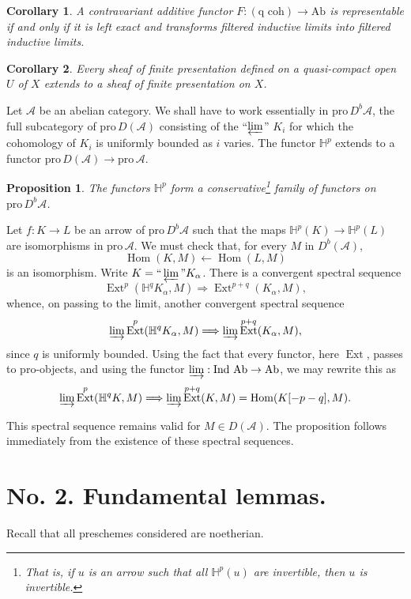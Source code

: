\documentclass[12pt]{amsart}
\theoremstyle{plain}
\newtheorem{prop}{Proposition}
\newtheorem{cor}{Corollary}
\theoremstyle{definition}
\DeclareMathOperator{\Hom}{Hom}
\DeclareMathOperator{\Ext}{Ext}
\newcommand{\Ind}{\text{Ind}\,}
\newcommand{\Pro}{\text{pro}\,}
\newcommand{\Ab}{\text{Ab}}
\newcommand{\cA}{\mathcal{A}}
\newcommand{\cDb}{D^{b}}
\newcommand{\cD}{D}
\newcommand{\bH}{\mathbb{H}}
\begin{document}
\begin{cor}
A contravariant additive functor $F:(\text{q coh})\to\Ab$ is representable if and only if it is left exact and transforms filtered inductive limits into filtered inductive limits.
\end{cor}

\begin{cor}
Every sheaf of finite presentation defined on a quasi-compact open $U$ of $X$ extends to a sheaf of finite presentation on $X$.
\end{cor}

\medskip

Let $\cA$ be an abelian category. We shall have to work essentially in $\Pro\cDb\cA$, the full subcategory of $\Pro\cD(\cA)$ consisting of the ``$\varprojlim$'' $K_i$ for which the cohomology of $K_i$ is uniformly bounded as $i$ varies. The functor $\bH^p$ extends to a functor $\Pro\cD(\cA)\to\Pro\cA$.

\begin{prop}
The functors $\bH^p$ form a conservative\footnote{That is, if $u$ is an arrow such that all $\bH^p(u)$ are invertible, then $u$ is invertible.} family of functors on $\Pro\cDb\cA$.
\end{prop}

Let $f:K\to L$ be an arrow of $\Pro\cDb\cA$ such that the maps $\bH^p(K)\to\bH^p(L)$ are isomorphisms in $\Pro\cA$. We must check that, for every $M$ in $\cDb(\cA)$,
\[
\Hom(K,M)\longleftarrow\Hom(L,M)
\]
is an isomorphism. Write $K=\text{``}\varprojlim\text{''}K_\alpha$. There is a convergent spectral sequence
\[
\Ext^p(\bH^qK_\alpha,M)\Longrightarrow\Ext^{p+q}(K_\alpha,M),
\]
whence, on passing to the limit, another convergent spectral sequence
\[
\varinjlim\Ext^p(\bH^qK_\alpha,M)\Longrightarrow\varinjlim\Ext^{p+q}(K_\alpha,M),
\]
since $q$ is uniformly bounded. Using the fact that every functor, here $\Ext$, passes to pro-objects, and using the functor $\varinjlim:\Ind\,\Ab\to\Ab$, we may rewrite this as
\[
\varinjlim\Ext^p(\bH^qK,M)\Longrightarrow\varinjlim\Ext^{p+q}(K,M)=\Hom(K[-p-q],M).
\]

This spectral sequence remains valid for $M\in\cD(\cA)$. The proposition follows immediately from the existence of these spectral sequences.

\section*{No. 2. Fundamental lemmas.}

Recall that all preschemes considered are noetherian.
\end{document}
